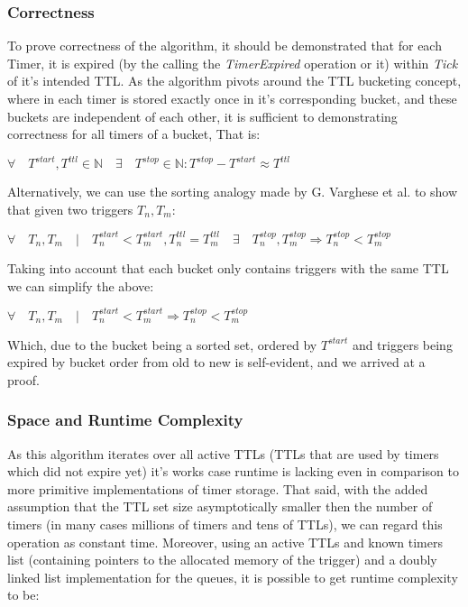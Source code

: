 \documentclass[twocolumn,a4paper]{article}
\begin{document}
\subsubsection{Correctness}
To prove correctness of the algorithm,  it should be demonstrated that for each Timer, it is expired (by the calling the \textit{TimerExpired} operation or it) within \textit{Tick} of it's intended TTL. As the algorithm pivots around the TTL bucketing concept, where in each timer is stored exactly once in it's corresponding bucket, and these buckets are independent of each other, it is sufficient to demonstrating correctness for all timers of a bucket, That is:
\begin{center}
	$\forall \quad T^{start}, T^{ttl} \in \mathbb{N} \quad \exists \quad T^{stop} \in \mathbb{N} : T^{stop}-T^{start} \approx T^{ttl}$
\end{center}

Alternatively, we can use the sorting analogy made by G. Varghese et al.\cite{TW} to show that given two triggers $T_n, T_m$: 

\begin{center}
	$\forall \quad T_n, T_m \quad | \quad T^{start}_n<T^{start}_m,  T^{ttl}_n = T^{ttl}_m \quad \exists\quad T^{stop}_n, T^{stop}_m  \Rightarrow T^{stop}_n < T^{stop}_m$
\end{center}

Taking into account that each bucket only contains triggers with the same TTL we can simplify the above:

\begin{center}
	$\forall \quad T_n, T_m \quad | \quad T^{start}_n<T^{start}_m \Rightarrow T^{stop}_n < T^{stop}_m$
\end{center}

Which, due to the bucket being a sorted set, ordered by $T^{start}$ and triggers being expired by bucket order from old to new is self-evident, and we arrived at a proof.

\subsubsection{Space and Runtime Complexity}
As this algorithm iterates over all active TTLs (TTLs that are used by timers which did not expire yet) it's works case runtime is lacking even in comparison to more primitive implementations of timer storage. That said, with the added assumption that the TTL set size asymptotically smaller then the number of timers (in many cases millions of timers and tens of TTLs), we can regard this operation as constant time. Moreover, using an active TTLs and known timers list (containing pointers to the allocated memory of the trigger) and a doubly linked list implementation for the queues, it is possible to get runtime complexity to be:
\end{document}
